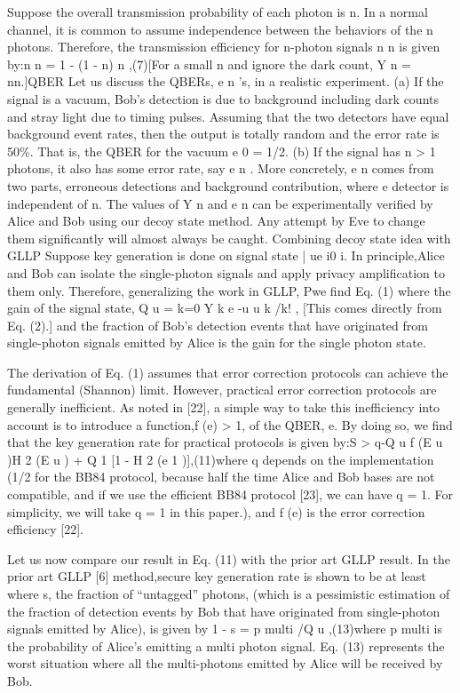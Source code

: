 Suppose the overall transmission probability of each photon is n. In a normal channel, it is common to assume independence between the behaviors of the n photons. Therefore, the transmission efficiency for n-photon signals n n is given by:n n = 1 - (1 - n) n ,(7)[For a small n and ignore the dark count, Y n = nn.]QBER Let us discuss the QBERs, e n ’s, in a realistic experiment.
(a) If the signal is a vacuum, Bob’s detection is due to background including dark counts and stray light due to timing pulses. Assuming that the two detectors have equal background event rates, then the output is totally random and the error rate is 50\%. That is, the QBER for the vacuum e 0 = 1/2.
(b) If the signal has n > 1 photons, it also has some error rate, say e n . More concretely, e n comes from two parts, erroneous detections and background contribution, where e detector is independent of n.
The values of Y n and e n can be experimentally verified by Alice and Bob using our decoy state method. Any attempt by Eve to change them significantly will almost always be caught.
Combining decoy state idea with GLLP Suppose key generation is done on signal state | ue i0 i. In principle,Alice and Bob can isolate the single-photon signals and apply privacy amplification to them only. Therefore, generalizing the work in GLLP, Pwe find Eq. (1) where the gain of the signal state, Q u = k=0 Y k e -u u k /k! , [This comes directly from Eq. (2).] and the fraction of Bob’s detection events that have originated from single-photon signals emitted by Alice is the gain for the single photon state.

The derivation of Eq. (1) assumes that error correction protocols can achieve the fundamental (Shannon) limit.
However, practical error correction protocols are generally inefficient. As noted in [22], a simple way to take this inefficiency into account is to introduce a function,f (e) > 1, of the QBER, e. By doing so, we find that the key generation rate for practical protocols is given by:S > q{-Q u f (E u )H 2 (E u ) + Q 1 [1 - H 2 (e 1 )]},(11)where q depends on the implementation (1/2 for the BB84 protocol, because half the time Alice and Bob bases are not compatible, and if we use the efficient BB84 protocol [23], we can have q = 1. For simplicity, we will take q = 1 in this paper.), and f (e) is the error correction efficiency [22].

Let us now compare our result in Eq. (11) with the prior art GLLP result. In the prior art GLLP [6] method,secure key generation rate is shown to be at least where s, the fraction of “untagged” photons, (which is a pessimistic estimation of the fraction of detection events by Bob that have originated from single-photon signals emitted by Alice), is given by 1 - s = p multi /Q u ,(13)where p multi is the probability of Alice’s emitting a multi photon signal. Eq. (13) represents the worst situation where all the multi-photons emitted by Alice will be received by Bob.

